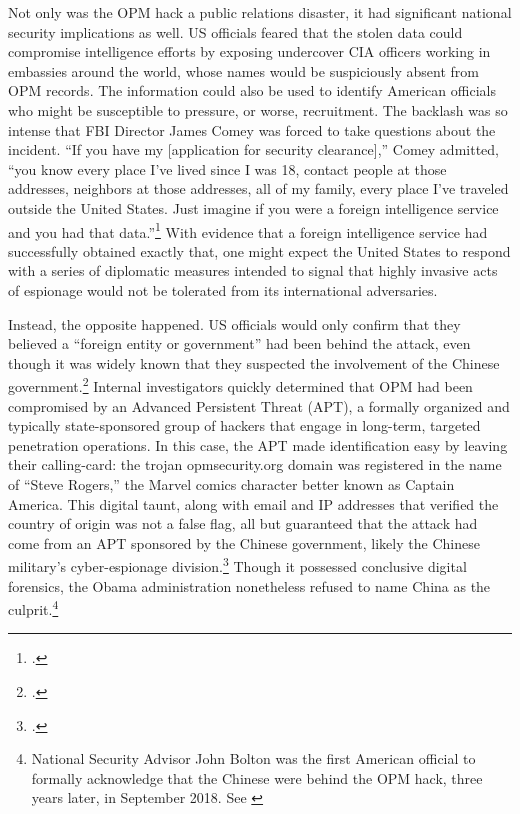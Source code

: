 \documentclass[14pt]{extarticle}
\begin{document}
Not only was the OPM hack a public relations disaster, it had significant national security implications as well. US officials feared that the stolen data could compromise intelligence efforts by exposing undercover CIA officers working in embassies around the world, whose names would be suspiciously absent from OPM records. The information could also be used to identify American officials who might be susceptible to pressure, or worse, recruitment. The backlash was so intense that FBI Director James Comey was forced to take questions about the incident. ``If you have my [application for security clearance],'' Comey admitted, ``you know every place I've lived since I was 18, contact people at those addresses, neighbors at those addresses, all of my family, every place I've traveled outside the United States. Just imagine if you were a foreign intelligence service and you had that data.''\footcite{nakashima_hacks_2015} With evidence that a foreign intelligence service had successfully obtained exactly that, one might expect the United States to respond with a series of diplomatic measures intended to signal that highly invasive acts of espionage would not be tolerated from its international adversaries.

Instead, the opposite happened. US officials would only confirm that they believed a \enquote{foreign entity or government} had been behind the attack, even though it was widely known that they suspected the involvement of the Chinese government.\footcite{spetalnick_china_2015} Internal investigators quickly determined that OPM had been compromised by an Advanced Persistent Threat (APT), a formally organized and typically state-sponsored group of hackers that engage in long-term, targeted penetration operations. In this case, the APT made identification easy by leaving their calling-card: the trojan opmsecurity.org domain was registered in the name of \enquote{Steve Rogers,} the Marvel comics character better known as Captain America. This digital taunt, along with email and IP addresses that verified the country of origin was not a false flag, all but guaranteed that the attack had come from an APT sponsored by the Chinese government, likely the Chinese military's cyber-espionage division.\footcite{koerner_inside_2016} Though it possessed conclusive digital forensics, the Obama administration nonetheless refused to name China as the culprit.\footnote{National Security Advisor John Bolton was the first American official to formally acknowledge that the Chinese were behind the OPM hack, three years later, in September 2018. See \cite{sanger_trump_2018}}
\end{document}
